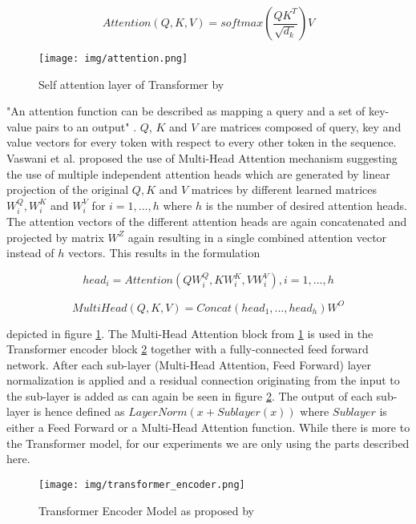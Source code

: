 \begin{equation}
	Attention(Q,K,V) = softmax(\frac{QK^T}{\sqrt{d_k}})V
\end{equation}

\begin{figure}[h]
	\centering
	\texttt{[image: img/attention.png]}
	\caption{Self attention layer of Transformer by \cite{attention_origin}}
	\label{fig:attention}
\end{figure}

"An attention function can be described as mapping a query and a set of key-value pairs to an output" \cite{attention_origin}. $Q$, $K$ and $V$ are matrices composed of query, key and value vectors for every token with respect to every other token in the sequence.
Vaswani et al. proposed the use of Multi-Head Attention mechanism suggesting the use of multiple independent attention heads which are generated by linear projection of the original $Q, K$ and $V$ matrices by different learned matrices $W^Q_i, W^K_i$ and $W^V_i$ for $i = 1, ... ,h$ where $h$ is the number of desired attention heads. The attention vectors of the different attention heads are again concatenated and projected by matrix $W^Z$ again resulting in a single combined attention vector instead of $h$ vectors. This results in the formulation 

\begin{equation}
	head_i = Attention(QW^Q_i, KW^K_i, VW^V_i), i = 1, ..., h
\end{equation}

\begin{equation}
	MultiHead(Q,K,V) = Concat(head_1, ..., head_h)W^O
\end{equation}

depicted in figure \ref{fig:attention}. The Multi-Head Attention block from \ref{fig:attention} is
used in the Transformer encoder block \ref{fig:transformer_encoder} together with a fully-connected feed forward network. After each sub-layer (Multi-Head Attention, Feed Forward) layer normalization is applied and a residual connection originating from the input to the sub-layer is added as can again be seen in figure \ref{fig:transformer_encoder}. The output of each sub-layer is hence defined as $LayerNorm(x + Sublayer(x))$ where $Sublayer$ is either a Feed Forward or a Multi-Head Attention function. While there is more to the Transformer model, for our experiments we are only using the parts described here.

\begin{figure}[h]
	\centering
	\texttt{[image: img/transformer\_encoder.png]}
	\caption{Transformer Encoder Model as proposed by \cite{attention_origin}}
	\label{fig:transformer_encoder}
\end{figure}

